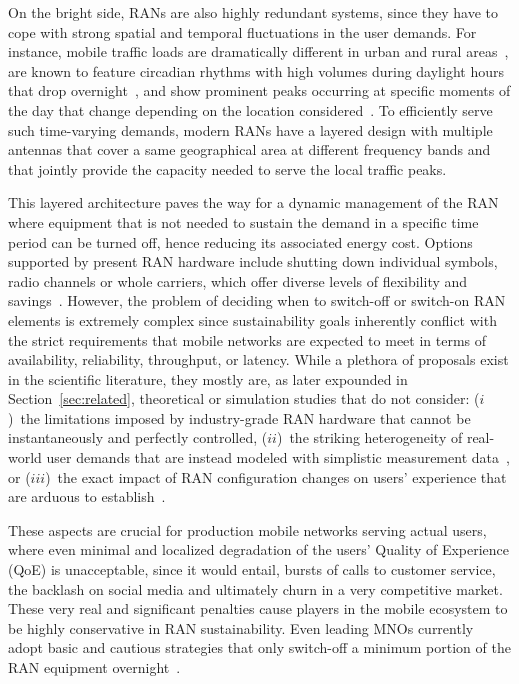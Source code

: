 On the bright side, RANs are also highly redundant systems, since they have to cope with strong spatial and temporal fluctuations in the user demands. For instance, mobile traffic loads are dramatically different in urban and rural areas~\cite{digital_divide_sachit}, are known to feature circadian rhythms with high volumes during daylight hours that drop overnight~\cite{mobile_rhythms_esteban, brunolepri2016countrywide}, and show prominent peaks occurring at specific moments of the day that change depending on the location considered~\cite{tale_10_cities_marco}. To efficiently serve such time-varying demands, modern RANs have a layered design with multiple antennas that cover a same geographical area at different frequency bands and that jointly provide the capacity needed to serve the local traffic peaks.

This layered architecture paves the way for a dynamic management of the RAN where equipment %
that is not needed to sustain the demand in a specific time period can be turned off, hence reducing its associated energy cost. Options supported by present RAN hardware include shutting down individual symbols, radio channels or whole carriers, which offer diverse levels of flexibility and savings~\cite{survey_5g_energy_efficiency, user_transfer_5g}.
%
However, the problem of deciding when to switch-off or switch-on %
RAN elements is extremely complex since sustainability goals inherently conflict with the strict requirements that mobile networks are expected to meet in terms of availability, reliability, throughput, or latency.
%
While a plethora of proposals exist in the scientific literature, they mostly are, as later expounded in Section~\ref{sec:related}, theoretical or simulation studies that do not consider: ($i$)~the limitations imposed by industry-grade RAN hardware that cannot be instantaneously and perfectly controlled,
($ii$)~the striking heterogeneity of real-world user demands that are instead modeled with simplistic measurement data~\cite{survey_5g_energy_efficiency, user_transfer_5g}, or ($iii$)~the exact impact of RAN configuration changes on users' experience that are arduous to establish~\cite{auric,chroma,data_driven_energy23}.

These aspects are crucial for production mobile networks serving actual users, where even minimal and localized degradation of the users’ Quality of Experience (QoE) is unacceptable, since it would entail, \eg bursts of calls to customer service, the backlash on social media and ultimately churn in a very competitive market.
%
These very real and significant penalties cause players in the mobile ecosystem to be highly conservative in RAN sustainability. Even leading MNOs currently adopt basic and cautious strategies that only switch-off a minimum portion of the RAN equipment overnight~\cite{Tan2022}.

